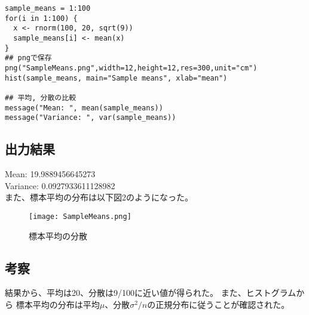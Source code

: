 \documentclass{jsarticle}
\begin{document}
\begin{lstlisting}[caption=Norm.R]
sample_means = 1:100
for(i in 1:100) {
  x <- rnorm(100, 20, sqrt(9))
  sample_means[i] <- mean(x)
}
## pngで保存
png("SampleMeans.png",width=12,height=12,res=300,unit="cm")
hist(sample_means, main="Sample means", xlab="mean")

## 平均, 分散の比較
message("Mean: ", mean(sample_means))
message("Variance: ", var(sample_means))
\end{lstlisting}

\subsection{出力結果}
Mean: 19.9889456645273\\
Variance: 0.0927933611128982\\

また、標本平均の分布は以下図2のようになった。

\begin{figure}[h]
    \centering
    \caption[標本平均の分散]{標本平均の分散}
    \texttt{[image: SampleMeans.png]}
\end{figure}

\subsection{考察}
結果から、平均は20、分散は9/100に近い値が得られた。
また、ヒストグラムから
標本平均の分布は平均$\mu$、分散$\sigma^2/n$の正規分布に従うことが確認された。
\end{document}

